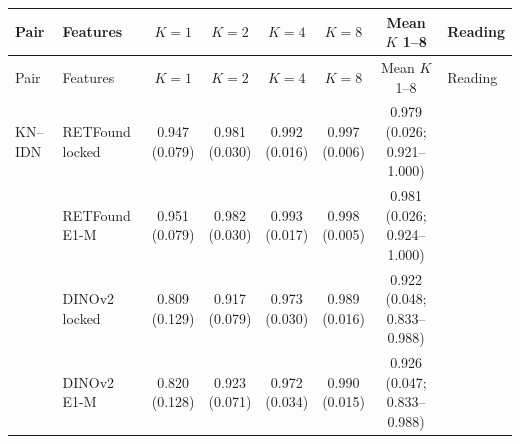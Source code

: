 \begin{longtable}{@{}llcccccp{3cm}@{}}
\toprule
Pair & Features & $K=1$ & $K=2$ & $K=4$ & $K=8$ & Mean $K$ 1--8 & Reading \\
\midrule
\endfirsthead
\toprule
Pair & Features & $K=1$ & $K=2$ & $K=4$ & $K=8$ & Mean $K$ 1--8 & Reading \\
\midrule
\endhead
\bottomrule
\endfoot
\bottomrule
\endlastfoot
KN--IDN & RETFound locked & \makecell{0.947\\{\scriptsize (0.079)}} & \makecell{0.981\\{\scriptsize (0.030)}} & \makecell{0.992\\{\scriptsize (0.016)}} & \makecell{0.997\\{\scriptsize (0.006)}} & \makecell{0.979\\{\scriptsize (0.026; 0.921--1.000)}} &  \\
 & RETFound E1-M & \makecell{0.951\\{\scriptsize (0.079)}} & \makecell{0.982\\{\scriptsize (0.030)}} & \makecell{0.993\\{\scriptsize (0.017)}} & \makecell{0.998\\{\scriptsize (0.005)}} & \makecell{0.981\\{\scriptsize (0.026; 0.924--1.000)}} &  \\
 & DINOv2 locked & \makecell{0.809\\{\scriptsize (0.129)}} & \makecell{0.917\\{\scriptsize (0.079)}} & \makecell{0.973\\{\scriptsize (0.030)}} & \makecell{0.989\\{\scriptsize (0.016)}} & \makecell{0.922\\{\scriptsize (0.048; 0.833--0.988)}} &  \\
 & DINOv2 E1-M & \makecell{0.820\\{\scriptsize (0.128)}} & \makecell{0.923\\{\scriptsize (0.071)}} & \makecell{0.972\\{\scriptsize (0.034)}} & \makecell{0.990\\{\scriptsize (0.015)}} & \makecell{0.926\\{\scriptsize (0.047; 0.833--0.988)}} &  \\

\end{longtable}
